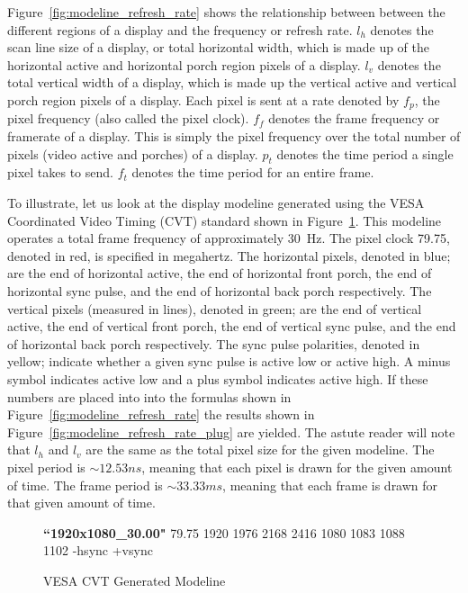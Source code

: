     Figure~\ref{fig:modeline_refresh_rate} shows the relationship between between the different regions of a display and the frequency or refresh rate. $l_h$ denotes the scan line size of a display, or total horizontal width, which is made up of the horizontal active and horizontal porch region pixels of a display. $l_v$ denotes the total vertical width of a display, which is made up the vertical active and vertical porch region pixels of a display. Each pixel is sent at a rate denoted by $f_p$, the pixel frequency (also called the pixel clock). $f_f$ denotes the frame frequency or framerate of a display. This is simply the pixel frequency over the total number of pixels (video active and porches) of a display. $p_t$ denotes the time period a single pixel takes to send. $f_t$ denotes the time period for an entire frame.

    To illustrate, let us look at the display modeline generated using the VESA Coordinated Video Timing (CVT) standard shown in Figure~\ref{fig:modeline_example}. This modeline operates a total frame frequency of approximately \mbox{30 Hz}. The pixel clock 79.75, denoted in red, is specified in megahertz. The horizontal pixels, denoted in blue; are the end of horizontal active, the end of horizontal front porch, the end of horizontal sync pulse, and the end of horizontal back porch respectively. The vertical pixels (measured in lines), denoted in green; are the end of vertical active, the end of vertical front porch, the end of vertical sync pulse, and the end of horizontal back porch respectively. The sync pulse polarities, denoted in yellow; indicate whether a given sync pulse is active low or active high. A minus symbol indicates active low and a plus symbol indicates active high. If these numbers are placed into into the formulas shown in Figure~\ref{fig:modeline_refresh_rate} the results shown in Figure~\ref{fig:modeline_refresh_rate_plug} are yielded. The astute reader will note that $l_h$ and $l_v$ are the same as the total pixel size for the given modeline. The pixel period is $\sim12.53 ns$, meaning that each pixel is drawn for the given amount of time. The frame period is $\sim33.33 ms$, meaning that each frame is drawn for that given amount of time.

    \begin{figure}
        \centering
        { \normalsize
        \textbf{``1920x1080\_30.00"} {\color{red}79.75}  {\color{blue} 1920 1976 2168 2416}  {\color{darkgreen}1080 1083 1088 1102} {\color{olive}-hsync +vsync}
        }
        \caption{VESA CVT Generated Modeline}
        \label{fig:modeline_example}
    \end{figure}

